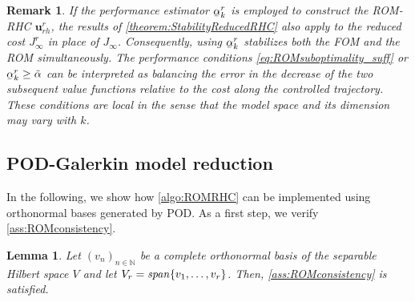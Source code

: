 \documentclass{m2an}
\newcommand{\N}{\mathbb N}
\newcommand{\bu}{\mathbf{u}}
\newcommand{\ubar}[1]{\underaccent{\bar}{#1}}
\newtheorem{lemma}[thrm]{Lemma}
\newtheorem{remark}[thrm]{Remark}
\begin{document}
%
\begin{remark}\label{rem:perfrind}
    If the performance estimator $\ubar \alpha_k^r$ is employed to construct the ROM-RHC $\bu_{rh}^r$, the results of \cref{theorem:StabilityReducedRHC} also apply to the reduced cost $J^r_\infty$ in place of $J_\infty$. Consequently, using $\ubar \alpha_k^r$ stabilizes both the FOM and the ROM simultaneously. {The performance conditions
\eqref{eq:ROMsuboptimality_suff} or $\ubar{\alpha}_k^r \ge \tilde\alpha$
can be interpreted as balancing the error in the decrease of the two subsequent value functions relative to the cost along the controlled trajectory. These conditions are local in the sense that the model space and its
dimension may vary with $k$.}
\end{remark}

%
\subsection{POD-Galerkin model reduction}\label{subsec:POD}
%
In the following, we show how \cref{algo:ROMRHC} can be implemented using orthonormal bases generated by POD. As a first step, we verify \cref{ass:ROMconsistency}.
%
\begin{lemma}
    \label{lem:alpha_convergence}
    Let $(v_n)_{n\in \N}$ be a complete orthonormal basis of the separable Hilbert space $V$ and let $V_r=\text{\emph{span}}\{v_1,\ldots,v_r\}$.
    Then,  \cref{ass:ROMconsistency} is satisfied.
\end{lemma}
%
\end{document}
